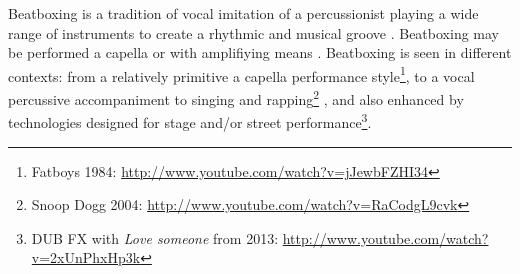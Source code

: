 Beatboxing is a tradition of vocal imitation of a percussionist playing a wide range of instruments to create a rhythmic and musical groove \citep{Stowell2008}. 
Beatboxing may be performed a capella or with amplifiying means \citep{Stowell2008}. 
Beatboxing is seen in different contexts: from a relatively primitive a capella performance style\footnote{Fatboys 1984: \url{http://www.youtube.com/watch?v=jJewbFZHI34}}, to a vocal percussive accompaniment to singing and rapping\footnote{Snoop Dogg 2004: \url{http://www.youtube.com/watch?v=RaCodgL9cvk}} , and also enhanced by technologies designed for stage and/or street performance\footnote{DUB FX with \textit{Love someone} from 2013: \url{http://www.youtube.com/watch?v=2xUnPhxHp3k}}.

